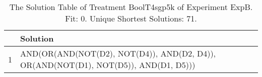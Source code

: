 \begin{table}[ht]
\centering
\begin{tabular}{rp{9cm}}
  \hline
 & Solution \\ 
  \hline
1 & AND(OR(AND(NOT(D2), NOT(D4)), AND(D2, D4)), OR(AND(NOT(D1), NOT(D5)), AND(D1, D5))) \\ 
   \hline
\end{tabular}
\caption{The Solution Table of Treatment BoolT4sgp5k of Experiment ExpB. Fit: 0. Unique Shortest Solutions: 71.} 
\end{table}
